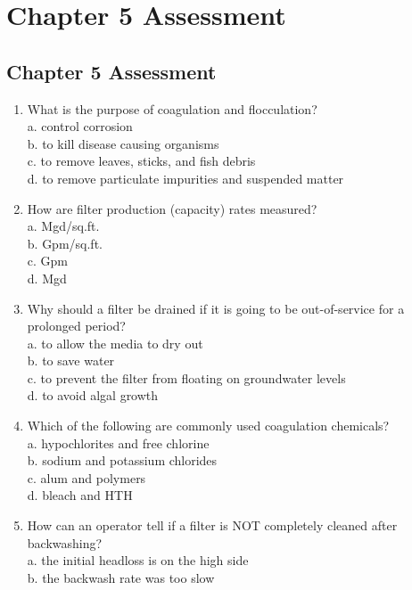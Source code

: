 
\chapter*{Chapter 5 Assessment}
\section*{Chapter 5 Assessment}
\begin{enumerate}[1.]
\item What is the purpose of coagulation and flocculation?\\
a. control corrosion\\
b. to kill disease causing organisms\\
c. to remove leaves, sticks, and fish debris\\
d. to remove particulate impurities and suspended matter\\
\item How are filter production (capacity) rates measured?\\
a. Mgd/sq.ft.\\
b. Gpm/sq.ft.\\
c. Gpm\\
d. Mgd\\
\item Why should a filter be drained if it is going to be out-of-service for a prolonged period?\\
a. to allow the media to dry out\\
b. to save water\\
c. to prevent the filter from floating on groundwater levels\\
d. to avoid algal growth\\
\item Which of the following are commonly used coagulation chemicals?\\
a. hypochlorites and free chlorine\\
b. sodium and potassium chlorides\\
c. alum and polymers\\
d. bleach and HTH\\
\item How can an operator tell if a filter is NOT completely cleaned after backwashing?\\
a. the initial headloss is on the high side\\
b. the backwash rate was too slow\\

\end{enumerate}

